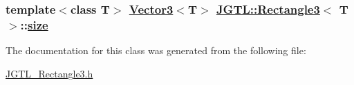\hypertarget{class_j_g_t_l_1_1_rectangle3_9f63a1e076b374db4ebfa32de77ed4a5}{
\subsubsection[size]{\setlength{\rightskip}{0pt plus 5cm}template$<$class T$>$ \hyperlink{class_j_g_t_l_1_1_vector3}{Vector3}$<$T$>$ \hyperlink{class_j_g_t_l_1_1_rectangle3}{JGTL::Rectangle3}$<$ T $>$::\hyperlink{class_j_g_t_l_1_1_rectangle3_9f63a1e076b374db4ebfa32de77ed4a5}{size}}}
\label{class_j_g_t_l_1_1_rectangle3_9f63a1e076b374db4ebfa32de77ed4a5}




The documentation for this class was generated from the following file:\begin{CompactItemize}
\item 
\hyperlink{_j_g_t_l___rectangle3_8h}{JGTL\_\-Rectangle3.h}\end{CompactItemize}
